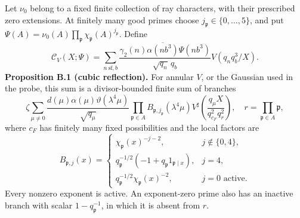 \documentclass[11pt,a4paper]{article}
\begin{document}
Let \(\nu_0\) belong to a fixed finite collection of ray characters, with their prescribed zero extensions. At finitely many good primes choose \(j_{\mathfrak p}\in\{0,\ldots,5\}\), and put \(\Psi(A)=\nu_0(A)\prod_{\mathfrak p}\chi_{\mathfrak p}(A)^{j_{\mathfrak p}}\). Define \[
\mathcal C_V(X;\Psi)=
\sum_{n\ \mathrm{sf},b}
\frac{\gamma_2(n)\overline{\alpha(nb^3)}\Psi(nb^3)}{\sqrt{q_n}\,q_b}
V(q_nq_b^3/X).
\tag{B.1}\label{eq:B.1}
\] \textbf{Proposition B.1 (cubic reflection).} For annular \(V\), or the Gaussian used in the probe, this sum is a divisor-bounded finite sum of branches \[
\zeta\sum_{\mu\ne0}\frac{d(\mu)\alpha(\mu)\vartheta(\lambda^4\mu)}{\sqrt{q_\mu}}
\prod_{\mathfrak p\in A}B_{\mathfrak p,j_{\mathfrak p}}(\lambda^4\mu)
V^\sharp\!\left(\frac{q_\mu X}{q_{c_F}^{2}q_r^{2}}\right),
\quad r=\prod_{\mathfrak p\in A}\mathfrak p,
\tag{B.2}\label{eq:B.2}
\] where \(c_F\) has finitely many fixed possibilities and the local factors are \[
B_{\mathfrak p,j}(x)=
\begin{cases}
\chi_{\mathfrak p}(x)^{-j-2},&j\notin\{0,4\},\\
q_{\mathfrak p}^{-1/2}(-1+q_{\mathfrak p}1_{\mathfrak p\mid x}),&j=4,\\
q_{\mathfrak p}^{-1/2}\chi_{\mathfrak p}(x)^{-2},&j=0\text{ active}.
\end{cases}
\tag{B.3}\label{eq:B.3}
\] Every nonzero exponent is active. An exponent-zero prime also has an inactive branch with scalar \(1-q_{\mathfrak p}^{-1}\), in which it is absent from \(r\).
\end{document}
